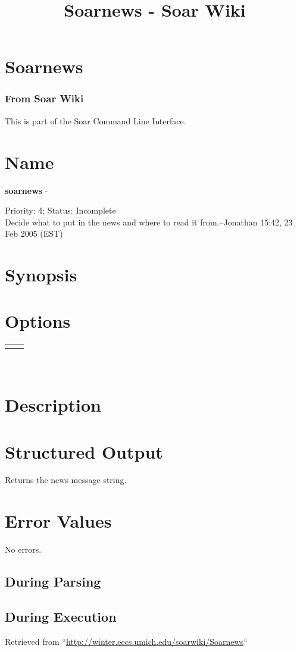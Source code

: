 \documentclass[10pt]{article}
\title{Soarnews - Soar Wiki}
\begin{document}
\section*{Soarnews}
\subsubsection*{From Soar Wiki}


 This is part of the Soar Command Line Interface. 
\section*{ Name }


 \textbf{soarnews}
 - 


 Priority: 4; Status: Incomplete\\ 
Decide what to put in the news and where to read it from.--Jonathan 15:42, 23 Feb 2005 (EST) 
\section*{ Synopsis }
\section*{ Options }


\begin{tabular}{|c|c|}
\hline 
 & \\
 \hline 
 & \\
 \hline 

\end{tabular}



 \\ 

\section*{ Description }
\section*{ Structured Output }


 Returns the news message string. 
\section*{ Error Values }


 No errors. 
\subsection*{ During Parsing }
\subsection*{ During Execution }
 Retrieved from ``\url{http://winter.eecs.umich.edu/soarwiki/Soarnews}``
\end{document}
